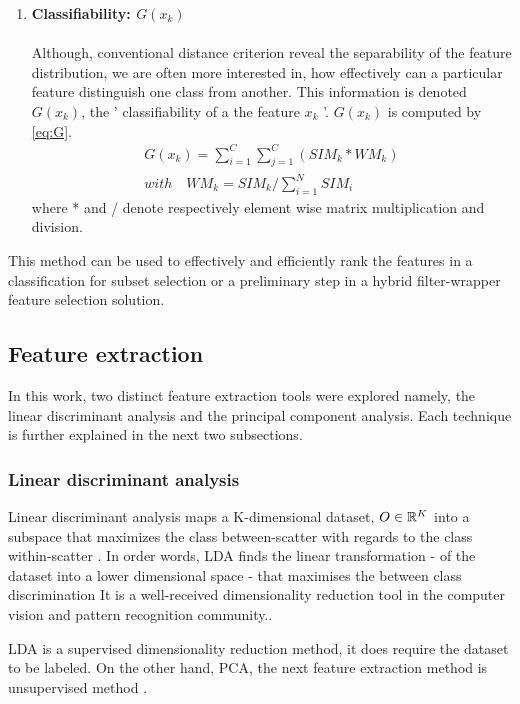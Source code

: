 \begin{enumerate}
	
	\item \textbf{Classifiability: \(G(x_k)\)} \label{con:class}\\\\
	Although, conventional distance criterion reveal the separability of the feature distribution, \cite{sima2013}
	 we are often more interested in, how effectively can a particular feature distinguish one class from another. This information is denoted \(G(x_k)\), the ' classifiability of a the feature \(x_k\) '.
	 \(G(x_k)\) is computed by \ref{eq:G}.
	 \begin{align}
	 	G(x_k) = \sum_{i = 1}^{C}\sum_{j = 1}^{C}(SIM_k*WM_k) \label{eq:G}
	 	\\ with \quad WM_k = SIM_k / \sum_{i=1}^{N}SIM_i
	 \end{align}
	 where * and / denote respectively element wise matrix multiplication and division.
\end{enumerate}

This method can be used to effectively and efficiently rank the features in a classification for subset selection or a preliminary step in a hybrid filter-wrapper feature selection solution.  

\subsection{Feature extraction}
In this work, two distinct feature extraction tools were explored namely, the linear discriminant analysis and the principal component analysis.
Each technique is further explained in the next two subsections.
 
\subsubsection{Linear discriminant analysis}
Linear discriminant analysis maps a K-dimensional dataset, \(O \in \Bbb R^{K}\) into a subspace that maximizes the class between-scatter with regards to the class within-scatter \cite{prtool}.
In order words, LDA finds the linear transformation - of the dataset into a lower dimensional space - that maximises the between class discrimination \cite{lda2015}
It is a well-received dimensionality reduction tool in the computer vision and pattern recognition community.\cite{lda2015}.

 LDA is a supervised dimensionality reduction method, it does require the dataset to be labeled. On the other hand, PCA, the next feature extraction method is unsupervised method \cite{prtool}.
 
